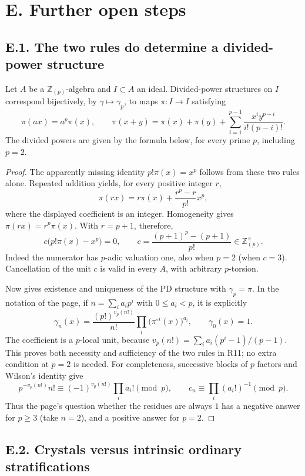 \section{E. Further open steps}
\subsection{E.1. The two rules do determine a divided-power structure}

\begin{theorem}\label{thm:DE-PD-pi}
Let $A$ be a $\mathbb Z_{(p)}$-algebra and $I\subset A$ an ideal.  Divided-power structures on $I$ correspond bijectively, by $\gamma\mapsto\gamma_p$, to maps $\pi:I\to I$ satisfying
\[
 \pi(ax)=a^p\pi(x),\qquad
 \pi(x+y)=\pi(x)+\pi(y)+\sum_{i=1}^{p-1}\frac{x^iy^{p-i}}{i!(p-i)!}.
\]
The divided powers are given by the formula below, for every prime $p$, including $p=2$.
\end{theorem}
\begin{proof}
The apparently missing identity $p!\pi(x)=x^p$ follows from these two rules alone.  Repeated addition yields, for every positive integer $r$,
\[
 \pi(rx)=r\pi(x)+\frac{r^p-r}{p!}x^p,
\]
where the displayed coefficient is an integer.  Homogeneity gives $\pi(rx)=r^p\pi(x)$.  With $r=p+1$, therefore,
\[
 c\bigl(p!\pi(x)-x^p\bigr)=0,\qquad
 c=\frac{(p+1)^p-(p+1)}{p!}\in\mathbb Z_{(p)}^\times.
\]
Indeed the numerator has $p$-adic valuation one, also when $p=2$ (when $c=3$).  Cancellation of the unit $c$ is valid in every $A$, with arbitrary $p$-torsion.

Now \cite[Lemma~23.5.3, Tag~07GS]{StacksProject} gives existence and uniqueness of the PD structure with $\gamma_p=\pi$.  In the notation of the page, if $n=\sum_i a_ip^i$ with $0\leq a_i<p$, it is explicitly
\[
 \gamma_n(x)=\frac{(p!)^{v_p(n!)}}{n!}\prod_i\bigl(\pi^{\circ i}(x)\bigr)^{a_i},\qquad
 \gamma_0(x)=1.
\]
The coefficient is a $p$-local unit, because $v_p(n!)=\sum_i a_i(p^i-1)/(p-1)$.  This proves both necessity and sufficiency of the two rules in R11; no extra condition at $p=2$ is needed.  For completeness, successive blocks of $p$ factors and Wilson's identity give
\[
 p^{-v_p(n!)}n!\equiv(-1)^{v_p(n!)}\prod_i a_i!\pmod p,
 \qquad c_n\equiv\prod_i(a_i!)^{-1}\pmod p.
\]
Thus the page's question whether the residues are always $1$ has a negative answer for $p\geq3$ (take $n=2$), and a positive answer for $p=2$.
\end{proof}

\subsection{E.2. Crystals versus intrinsic ordinary stratifications}

